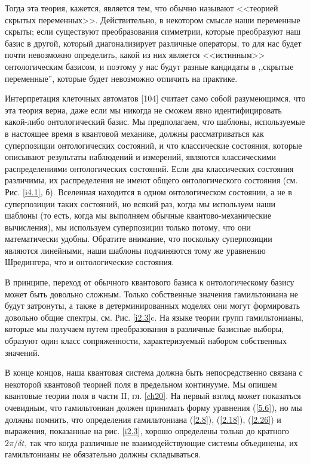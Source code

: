\documentclass[main.tex]{subfiles}
\begin{document}
Тогда эта теория, кажется, является тем, что обычно называют <<теорией скрытых переменных>>. Действительно, в некотором смысле наши переменные скрыты; если существуют преобразования симметрии, которые преобразуют наш базис в другой, который диагонализирует различные операторы, то для нас будет почти невозможно определить, какой из них является <<истинным>> онтологическим базисом, и поэтому у нас будут разные кандидаты в ,,скрытые переменные'', которые будет невозможно отличить на практике.

Интерпретация клеточных автоматов [104] считает само собой разумеющимся, что эта теория верна, даже если мы никогда не сможем явно идентифицировать какой-либо онтологический базис. Мы предполагаем, что шаблоны, используемые в настоящее время в квантовой механике, должны рассматриваться как суперпозиции онтологических состояний, и что классические состояния, которые описывают результаты наблюдений и измерений, являются классическими распределениями онтологических состояний. Если два классических состояния различимы, их распределения не имеют общего онтологического состояния (см. Рис. \ref{i4.1}, б). Вселенная находится в одном онтологическом состоянии, а не в суперпозиции таких состояний, но всякий раз, когда мы используем наши шаблоны (то есть, когда мы выполняем обычные квантово-механические вычисления), мы используем суперпозиции только потому, что они математически удобны. Обратите внимание, что поскольку суперпозиции являются линейными, наши шаблоны подчиняются тому же уравнению Шредингера, что и онтологические состояния.

В принципе, переход от обычного квантового базиса к онтологическому базису может быть довольно сложным. Только собственные значения гамильтониана не будут затронуты, а также в детерминированных моделях они могут формировать довольно общие спектры, см. Рис. \ref{i2.3}c. На языке теории групп гамильтонианы, которые мы получаем путем преобразования в различные базисные выборы, образуют один класс сопряженности, характеризуемый набором собственных значений.

В конце концов, наша квантовая система должна быть непосредственно связана с некоторой квантовой теорией поля в предельном континууме. Мы опишем квантовые теории поля в части II, гл. \ref{ch20}. На первый взгляд может показаться очевидным, что гамильтониан должен принимать форму уравнения (\ref{5.6}), но мы должны помнить, что определения гамильтониана (\ref{2.8}), (\ref{2.18}), (\ref{2.26}) и выражения, показанные на рис. \ref{i2.3}, хорошо определены только до кратного $2\pi/\delta t$, так что когда различные не взаимодействующие системы объединены, их гамильтонианы не обязательно должны складываться.
\end{document}
